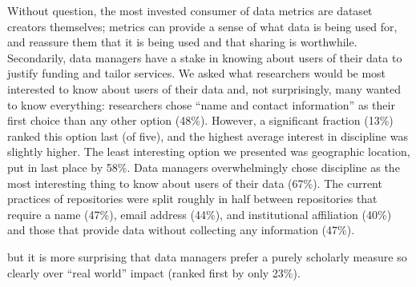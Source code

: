 
Without question, the most invested consumer of data metrics are dataset creators themselves; metrics can provide a sense of what data is being used for, and reassure them that it is being used and that sharing is worthwhile.
Secondarily, data managers have a stake in knowing about users of their data to justify funding and tailor services.
We asked what researchers would be most interested to know about users of their data and, not surprisingly, many wanted to know everything: researchers chose ``name and contact information'' as their first choice than any other option (48\%).
However, a significant fraction (13\%) ranked this option last (of five), and the highest average interest in discipline was slightly higher.
The least interesting option we presented was geographic location, put in last place by 58\%.
Data managers overwhelmingly chose discipline as the most interesting thing to know about users of their data (67\%).
The current practices of repositories were split roughly in half between repositories that require a name (47\%), email address (44\%), and institutional affiliation (40\%) and those that provide data without collecting any information (47\%).


but it is more surprising that data managers prefer a purely scholarly measure so clearly over ``real world'' impact (ranked first by only 23\%). 

